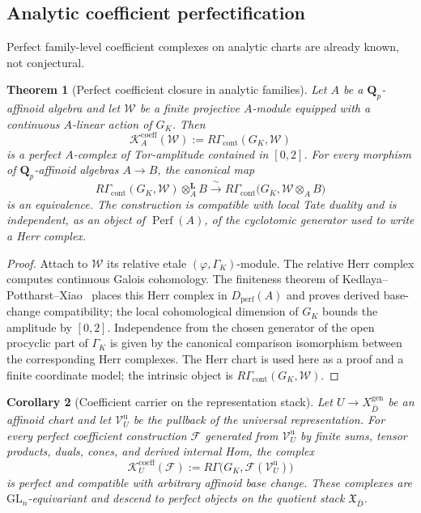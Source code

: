 \documentclass[11pt]{article}
\newtheorem{theorem}{Theorem}[section]
\newtheorem{corollary}[theorem]{Corollary}
\theoremstyle{definition}
\newcommand{\Qp}{\mathbf Q_p}
\newcommand{\Perf}{\operatorname{Perf}}
\begin{document}
\subsection{Analytic coefficient perfectification}\label{subsec:coefficient-perfectification}

Perfect family-level coefficient complexes on analytic charts are already known, not conjectural.

\begin{theorem}[Perfect coefficient closure in analytic families]\label{thm:kpx-coefficient-perfectness}
Let $A$ be a $\Qp$-affinoid algebra and let $\mathcal W$ be a finite projective $A$-module equipped with a continuous $A$-linear action of $G_K$.  Then
\[
\mathcal K_A^{\mathrm{coeff}}(\mathcal W)
:=R\Gamma_{\mathrm{cont}}(G_K,\mathcal W)
\]
is a perfect $A$-complex of Tor-amplitude contained in $[0,2]$.  For every morphism of $\Qp$-affinoid algebras $A\to B$, the canonical map
\begin{equation}\label{eq:coefficient-base-change}
R\Gamma_{\mathrm{cont}}(G_K,\mathcal W)
\otimes_A^{\mathbf L}B
\xrightarrow{\ \sim\ }
R\Gamma_{\mathrm{cont}}
\bigl(G_K,\mathcal W\otimes_A B\bigr)
\end{equation}
is an equivalence.  The construction is compatible with local Tate duality and is independent, as an object of $\Perf(A)$, of the cyclotomic generator used to write a Herr complex.
\end{theorem}

\begin{proof}
Attach to $\mathcal W$ its relative etale $(\varphi,\Gamma_K)$-module.  The relative Herr complex computes continuous Galois cohomology.  The finiteness theorem of Kedlaya--Pottharst--Xiao~\cite[Theorem~4.4.2 and its base-change corollaries]{KPXFamilies} places this Herr complex in $D_{\mathrm{perf}}(A)$ and proves derived base-change compatibility; the local cohomological dimension of $G_K$ bounds the amplitude by $[0,2]$.  Independence from the chosen generator of the open procyclic part of $\Gamma_K$ is given by the canonical comparison isomorphism between the corresponding Herr complexes.  The Herr chart is used here as a proof and a finite coordinate model; the intrinsic object is $R\Gamma_{\mathrm{cont}}(G_K,\mathcal W)$.
\end{proof}

\begin{corollary}[Coefficient carrier on the representation stack]\label{cor:stack-coefficient-carrier}
Let $U\to X_{\bar D}^{\mathrm{gen}}$ be an affinoid chart and let $\mathcal V_U^{\mathrm u}$ be the pullback of the universal representation.  For every perfect coefficient construction $\mathcal F$ generated from $\mathcal V_U^{\mathrm u}$ by finite sums, tensor products, duals, cones, and derived internal Hom, the complex
\[
\mathcal K_U^{\mathrm{coeff}}(\mathcal F)
:=R\Gamma\bigl(G_K,\mathcal F(\mathcal V_U^{\mathrm u})\bigr)
\]
is perfect and compatible with arbitrary affinoid base change.  These complexes are $\mathrm{GL}_n$-equivariant and descend to perfect objects on the quotient stack $\mathfrak X_{\bar D}$.
\end{corollary}
\end{document}
